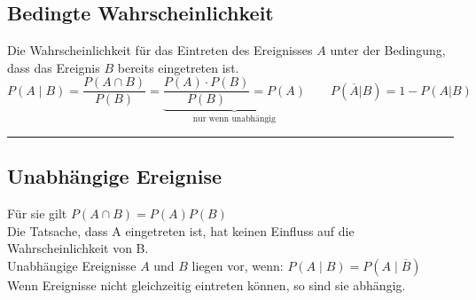 \subsection{Bedingte Wahrscheinlichkeit \skript{\pageref{sk-def-bedingte-wahrscheinlichkeit}}}
Die Wahrscheinlichkeit für das Eintreten des Ereignisses $A$ unter der
Bedingung, dass das Ereignis $B$ bereits eingetreten ist.
\[\boxed{P(A\mid B)= \dfrac{P(A\cap B)}{P(B)}}=\underbrace{\frac{P(A)\cdot
  P(B)}{P(B)}=P(A)}_{\text{nur wenn unabhängig}} \qquad P(\overline{A}|B) = 1 -
  P(A|B)\]
  
\hrule

\subsection{Unabhängige Ereignise \skript{\pageref{sk-def-unabhaengige-ereignisse}}}
		Für sie gilt \hspace*{5mm} $\boxed{P(A\cap B)=P(A)P(B)}$\\
    	Die Tatsache, dass A eingetreten ist, hat keinen Einfluss auf die 
		Wahrscheinlichkeit von B.\\
		Unabhängige Ereignisse $A$ und $B$ liegen vor, wenn: 
		\hspace*{5mm} $P(A\mid B)=P(A\mid \overline{B})$ \\	
		Wenn Ereignisse nicht gleichzeitig eintreten können, so sind sie abhängig.	

